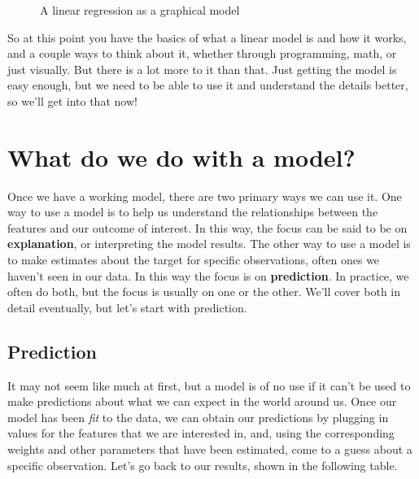 \documentclass[
  letterpaper,
]{krantz}
\begin{document}
\begin{figure}[H]


\caption{\label{fig-graph-lm}A linear regression as a graphical model}

\end{figure}%

So at this point you have the basics of what a linear model is and how
it works, and a couple ways to think about it, whether through
programming, math, or just visually. But there is a lot more to it than
that. Just getting the model is easy enough, but we need to be able to
use it and understand the details better, so we'll get into that now!

\section{What do we do with a model?}\label{sec-lm-what-do-we-do}

Once we have a working model, there are two primary ways we can use it.
One way to use a model is to help us understand the relationships
between the features and our outcome of interest. In this way, the focus
can be said to be on \textbf{explanation}, or interpreting the model
results. The other way to use a model is to make estimates about the
target for specific observations, often ones we haven't seen in our
data. In this way the focus is on \textbf{prediction}. In practice, we
often do both, but the focus is usually on one or the other. We'll cover
both in detail eventually, but let's start with prediction.

\subsection{Prediction}\label{sec-lm-prediction}

It may not seem like much at first, but a model is of no use if it can't
be used to make predictions about what we can expect in the world around
us. Once our model has been \emph{fit} to the data, we can obtain our
predictions by plugging in values for the features that we are
interested in, and, using the corresponding weights and other parameters
that have been estimated, come to a guess about a specific observation.
Let's go back to our results, shown in the following table.

\small
\end{document}
